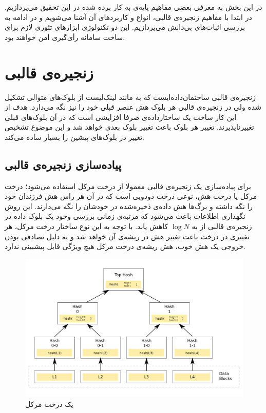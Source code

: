 در این بخش به معرفی بعضی مفاهیم پایه‌ی به کار برده شده در این تحقیق می‌پردازیم. در ابتدا با مفاهیم زنجیره‌ی قالبی، انواع و کاربرد‌های آن آشنا می‌شویم و در ادامه به بررسی اثبات‌های بی‌دانش می‌پردازیم. این دو تکنولوژی ابزارهای تئوری لازم برای ساخت سامانه رأی‌گیری امن خواهند بود.
\section{زنجیره‌ی قالبی}
زنجیره‌ی قالبی ساختمان‌داده‌ایست که به مانند لینک‌‌لیست
از بلوک‌‌های متوالی تشکیل شده ولی در زنجیره‌ی قالبی هر بلوک هش
عنصر قبلی خود را نیز نگه ‌می‌دارد. هدف از این کار ساخت یک ساختارداده‌ی صرفا افزایشی 
است که در آن‌ بلوک‌های قبلی تغییرناپذیرند. تغییر هر بلوک باعث تغییر بلوک بعدی خواهد شد و این موضوع تشخیص تغییر در بلوک‌های پیشین را بسیار ساده می‌کند.
\subsection{پیاده‌سازی زنجیره‌ی قالبی}


برای پیاده‌سازی یک زنجیره‌ی قالبی معمولا از درخت مرکل
 استفاده‌ می‌شود؛ درخت مرکل یا درخت هش، نوعی درخت دودویی 
 است که در آن هر راس هش فرزندان خود را نگه ‌داشته و برگ‌ها هش داده‌ی ذخیره‌شده در خودشان را نگه می‌دارند. این روش نگهداری اطلاعات باعث می‌شود که مرتبه‌‌ی زمانی بررسی وجود یک بلوک داده در زنجیره‌ی قالبی از 
 به 
$ \log N$
 کاهش یابد. با توجه به این نوع ساختار درخت مرکل، هر تغییری در درخت باعت تغییر هش در ریشه‌ی آن خواهد شد و به دلیل تصادفی بودن خروجی یک هش خوب، هش ریشه‌ی درخت مرکل هیچ ویژگی قابل پیشبینی ندارد.
 
 \begin{figure}[th!]
 	\centering
 	\includegraphics[width=.7\linewidth]{Hash_Tree.png}
 	\caption {یک درخت مرکل}
 	\label{fig:merkle}
 \end{figure}
 
